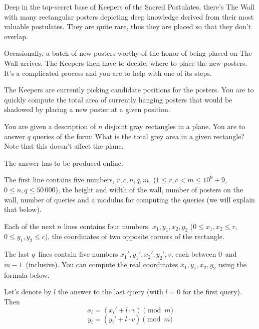 





Deep in the top-secret base of Keepers of the Sacred Postulates, there's The
Wall with many rectangular posters depicting deep knowledge derived from their
most valuable postulates. They are quite rare, thus they are placed so that they don't overlap.

Occasionally, a batch of new posters worthy of the honor of
being placed on The Wall arrives. The Keepers then have to decide, where to place
the new posters. It's a complicated process and you are to help with one of its steps.

The Keepers are currently picking candidate positions for the posters. You are
to quickly compute the total area of currently hanging posters that would
be shadowed by placing a new poster at a given position.


You are given a description of $n$ disjoint gray rectangles in a plane. You are to answer
$q$ queries of the form: What is the total grey area in a given rectangle?
Note that this doesn't affect the plane.

The answer has to be produced online.


The first line contains five numbers, $r, c, n, q, m$, ($1 \leq r, c < m \leq 10^9 + 9$, $0 \leq n,q \leq 50\,000$),
the height and width of the wall, number of posters on the wall, number of
queries and a modulus for computing the queries (we will explain that below).

Each of the next $n$ lines contains four numbers, $x_1, y_1, x_2, y_2$ ($0 \leq x_1, x_2 \leq r$,
$0 \leq y_1, y_2 \leq c$), the coordinates of two opposite corners of the rectangle.

The last $q$ lines contain five numbers $x_1', y_1', x_2', y_2', v$, each between
$0$ and $m - 1$ (inclusive). You can compute the real coordinates $x_1, y_1, x_2, y_2$
using the formula below.

Let's denote by $l$ the answer to the last query (with $l=0$ for the first query). Then 
$$x_i = (x_i' + l \cdot v) \pmod m$$
$$y_i = (y_i' + l \cdot v) \pmod m$$

